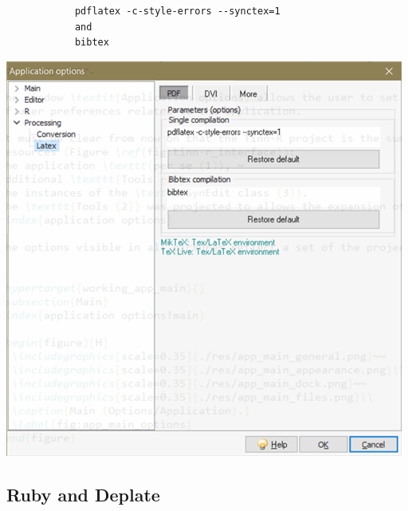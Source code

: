 \begin{itemize}
\begin{itemize}
        \begin{footnotesize}
          \begin{verbatim}
            pdflatex -c-style-errors --synctex=1
            and
            bibtex
          \end{verbatim}
        \end{footnotesize}

        \includegraphics[scale=1]{./res/app_processing_latex_pdf.png}\\
    \end{itemize}
\end{itemize}


\subsection{Ruby and Deplate}


